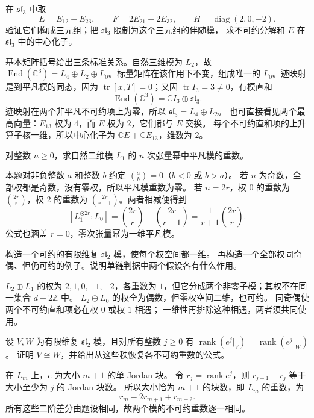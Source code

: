 \begin{exercise}\label{b5:ex:14-principal-sl3}
	在 \(\mathfrak{sl}_3\) 中取
	\[
		E=E_{12}+E_{23},\qquad F=2E_{21}+2E_{32},\qquad H=\operatorname{diag}(2,0,-2).
	\]
	验证它们构成三元组；把 \(\mathfrak{sl}_3\) 限制为这个三元组的伴随模， 求不可约分解和 \(E\) 在 \(\mathfrak{sl}_3\) 中的中心化子。
\end{exercise}
\begin{solution}
	基本矩阵括号给出三条标准关系。自然三维模为 \(L_2\)，故 \(\operatorname{End}(\mathbb C^3)=L_4\oplus L_2\oplus L_0\)。标量矩阵在该作用下不变，组成唯一的 \(L_0\)。迹映射是到平凡模的同态，因为 \(\operatorname{tr}[x,T]=0\)；又因 \(\operatorname{tr}I_3=3\ne0\)，有模直和
	\[
		\operatorname{End}(\mathbb C^3)=\mathbb CI_3\oplus\mathfrak{sl}_3.
	\]
	迹映射在两个非平凡不可约项上为零，所以 \(\mathfrak{sl}_3=L_4\oplus L_2\)。 也可直接看见两个最高向量：\(E_{13}\) 权为 \(4\)，而 \(E\) 权为 \(2\)，它们都与 \(E\) 交换。 每个不可约直和项的上升算子核一维，所以中心化子为 \(\mathbb CE+\mathbb CE_{13}\)，维数为 \(2\)。
\end{solution}

\begin{exercise}\label{b5:ex:14-tensor-invariant-count}
	对整数 \(n\ge0\)，求自然二维模 \(L_1\) 的 \(n\) 次张量幂中平凡模的重数。
\end{exercise}
\begin{solution}
	本题对非负整数 \(a\) 和整数 \(b\) 约定 \(\binom{a}{b}=0\)（\(b<0\) 或 \(b>a\)）。 若 \(n\) 为奇数，全部权都是奇数，没有零权，所以平凡模重数为零。 若 \(n=2r\)，权 \(0\) 的重数为 \(\binom{2r}{r}\)，权 \(2\) 的重数为 \(\binom{2r}{r-1}\)。两者相减便得到
	\[
		[L_1^{\otimes2r}:L_0] =\binom{2r}{r}-\binom{2r}{r-1} =\frac1{r+1}\binom{2r}{r}.
	\]
	公式也涵盖 \(r=0\)，零次张量幂为一维平凡模。
\end{solution}

\begin{exercise}\label{b5:ex:14-string-hypotheses}
	构造一个可约的有限维复 \(\mathfrak{sl}_2\) 模，使每个权空间都一维。 再构造一个全部权同奇偶、但仍可约的例子。说明单链判据中两个假设各有什么作用。
\end{exercise}
\begin{solution}
	\(L_2\oplus L_1\) 的权为 \(2,1,0,-1,-2\)，各重数为 \(1\)，但它分成两个非零子模；其权不在同一集合 \(d+2\mathbb Z\) 中。 \(L_2\oplus L_0\) 的权全为偶数，但零权空间二维，也可约。 同奇偶使两个不可约直和项必在权 \(0\) 或权 \(1\) 相遇； 一维性再排除这种相遇，两者须共同使用。
\end{solution}

\begin{exercise}\label{b5:ex:14-nilpotent-ranks-determine-module}
	设 \(V,W\) 为有限维复 \(\mathfrak{sl}_2\) 模，且对所有整数 \(j\geq0\) 有 \(\operatorname{rank}(e^j|_V)=\operatorname{rank}(e^j|_W)\)。 证明 \(V\cong W\)，并给出从这些秩恢复各不可约重数的公式。
\end{exercise}
\begin{solution}
	在 \(L_m\) 上，\(e\) 为大小 \(m+1\) 的单 Jordan 块。 令 \(r_j=\operatorname{rank}e^j\)，则 \(r_{j-1}-r_j\) 等于大小至少为 \(j\) 的 Jordan 块数。 所以大小恰为 \(m+1\) 的块数，即 \(L_m\) 的重数，为
	\[
		r_m-2r_{m+1}+r_{m+2}.
	\]
	所有这些二阶差分由题设相同，故两个模的不可约重数逐一相同。
\end{solution}
